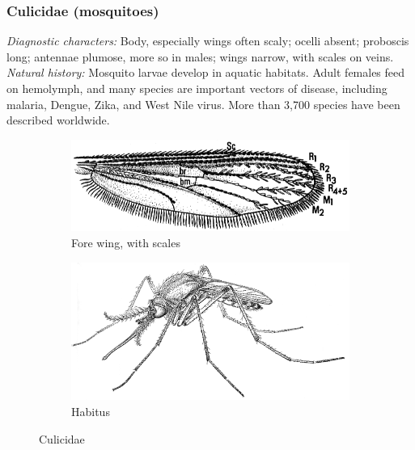 \documentclass[letterpaper, 11pt]{article}
\begin{document}
\subsubsection{Culicidae (mosquitoes)}
\noindent{}\textit{Diagnostic characters:} Body, especially wings often scaly; ocelli absent; proboscis long; antennae plumose, more so in males; wings narrow, with scales on veins.\\

\noindent{}\textit{Natural history:} Mosquito larvae develop in aquatic habitats. Adult females feed on hemolymph, and many species are important vectors of disease, including malaria, Dengue, Zika, and West Nile virus. More than 3,700 species have been described worldwide.

\begin{figure}[ht!]
    \centering
    \begin{subfigure}[ht!]{0.45\textwidth}
        \includegraphics[width=\textwidth]{CulicidWing}
        \caption{Fore wing, with scales \citep[][Fig. 25.5]{mcalpine1981manual}}
        \label{fig:culic1}
    \end{subfigure}
    \qquad
    \begin{subfigure}[ht!]{0.45\textwidth}
        \includegraphics[width=\textwidth]{CulicidHabitus}
        \caption{Habitus \citep[][Fig. 25.1]{mcalpine1981manual}}
        \label{fig:culic2}
    \end{subfigure}
    \caption{Culicidae}\label{fig:culicids}
\end{figure}
\end{document}
